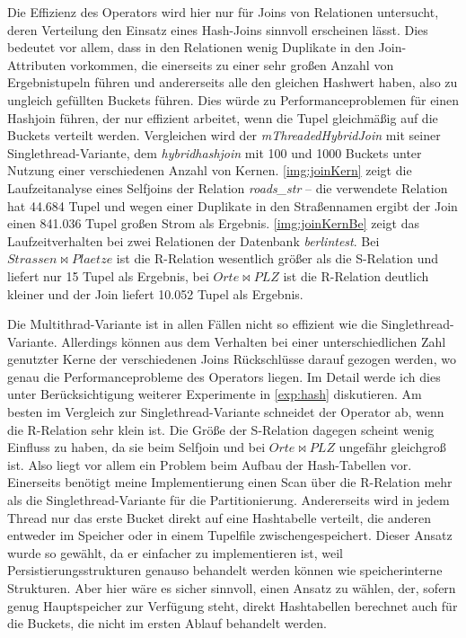 \documentclass[a4paper,12pt,twoside]{article}
\newcommand{\Fb}[1]{\textit{#1}} %
\begin{document}
{Die Effizienz des Operators wird hier nur für Joins von Relationen untersucht, deren Verteilung den Einsatz eines Hash-Joins sinnvoll erscheinen lässt. Dies bedeutet vor allem, dass in den Relationen wenig Duplikate in den Join-Attributen vorkommen, die einerseits zu einer sehr großen Anzahl von Ergebnistupeln führen und andererseits alle den gleichen Hashwert haben, also zu ungleich gefüllten Buckets führen. Dies würde zu Performanceproblemen für einen Hashjoin führen, der nur effizient arbeitet, wenn die Tupel gleichmäßig auf die Buckets verteilt werden. Vergleichen wird der \Fb{mThreadedHybridJoin} mit seiner Singlethread-Variante, dem \Fb{hybridhashjoin} mit 100 und 1000 Buckets unter Nutzung einer verschiedenen Anzahl von Kernen. \autoref{img:joinKern} zeigt die Laufzeitanalyse eines Selfjoins der Relation \Fb{roads\_str} -- die verwendete Relation hat 44.684 Tupel und wegen einer Duplikate in den Straßennamen ergibt der Join einen 841.036 Tupel großen Strom als Ergebnis. \autoref{img:joinKernBe} zeigt das Laufzeitverhalten bei zwei Relationen der Datenbank \Fb{berlintest}. Bei $Strassen \bowtie Plaetze$ ist die R-Relation wesentlich größer als die S-Relation und liefert nur 15 Tupel als Ergebnis, bei $Orte \bowtie PLZ$ ist die R-Relation deutlich kleiner und der Join liefert 10.052 Tupel als Ergebnis.

Die Multithrad-Variante ist in allen Fällen nicht so effizient wie die Singlethread-Variante. Allerdings können aus dem Verhalten bei einer unterschiedlichen Zahl genutzter Kerne der verschiedenen Joins Rückschlüsse darauf gezogen werden, wo genau die Performanceprobleme des Operators liegen. Im Detail werde ich dies unter Berücksichtigung weiterer Experimente in \autoref{exp:hash} diskutieren. Am besten im Vergleich zur Singlethread-Variante schneidet der Operator ab, wenn die R-Relation sehr klein ist. Die Größe der S-Relation dagegen scheint wenig Einfluss zu haben, da sie beim Selfjoin und bei $Orte \bowtie PLZ$ ungefähr gleichgroß ist. Also liegt vor allem ein Problem beim Aufbau der Hash-Tabellen vor. Einerseits benötigt meine Implementierung einen Scan über die R-Relation mehr als die Singlethread-Variante für die Partitionierung. Andererseits wird in jedem Thread nur das erste Bucket direkt auf eine Hashtabelle verteilt, die anderen entweder im Speicher oder in einem Tupelfile zwischengespeichert. Dieser Ansatz wurde so gewählt, da er einfacher zu implementieren ist, weil Persistierungsstrukturen genauso behandelt werden können wie speicherinterne Strukturen. Aber hier wäre es sicher sinnvoll, einen Ansatz zu wählen, der, sofern genug Hauptspeicher zur Verfügung steht, direkt Hashtabellen berechnet auch für die Buckets, die nicht im ersten Ablauf behandelt werden. 

}
\end{document}

